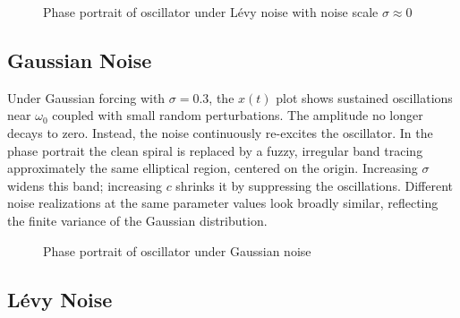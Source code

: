 \documentclass[12pt]{article}
\begin{document}
\begin{figure}[H]
    \centering
        \begin{minipage}{0.48\textwidth}
        \centering
        
        \caption{Displacement of oscillator under L\'evy noise with noise scale $\sigma\approx 0$}
    \end{minipage}
    \hfill
    \begin{minipage}{0.48\textwidth}
        \centering
        
        \caption{Phase portrait of oscillator under L\'evy noise with noise scale $\sigma\approx 0$}
    \end{minipage}
\end{figure}

\subsection{Gaussian Noise}

Under Gaussian forcing with $\sigma = 0.3$, the $x(t)$ plot shows sustained
oscillations near $\omega_0$ coupled with small random perturbations.
The amplitude no longer decays to zero. Instead, the noise continuously
re-excites the oscillator. In the phase portrait the clean spiral is replaced
by a fuzzy, irregular band tracing approximately the same elliptical region,
centered on the origin. Increasing $\sigma$ widens this band; increasing $c$
shrinks it by suppressing the oscillations.
Different noise realizations at the same parameter values look broadly similar,
reflecting the finite variance of the Gaussian distribution.

\begin{figure}[H]
    \centering
        \begin{minipage}{0.48\textwidth}
        \centering
        
        \caption{Displacement of oscillator under Gaussian noise}
    \end{minipage}
    \hfill
    \begin{minipage}{0.48\textwidth}
        \centering
        
        \caption{Phase portrait of oscillator under Gaussian noise}
    \end{minipage}
\end{figure}


\subsection{L\'{e}vy Noise}
\end{document}
